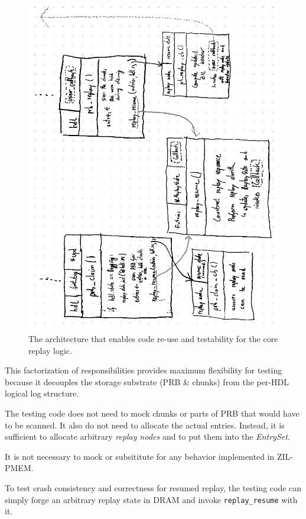 \documentclass[12pt,a4paper,twoside]{book}
\begin{document}
\begin{figure}[H]
    \centering
    \includegraphics{fig/prb_replay_resume_architecture}
    \caption{The architecture that enables code re-use and testability for the core replay logic.}
    \label{fig:eval:prb_replay_resume_architecture}
\end{figure}

This factorization of responsibilities provides maximum flexibility for testing because it decouples the storage substrate (PRB \& chunks) from the per-HDL logical log structure.
\begin{description}[noitemsep]
    \item[Independence of PRB \& Chunks]
        The testing code does not need to mock chunks or parts of PRB that would have to be scanned.
        It also do not need to allocate the actual entries.
        Instead, it is sufficient to allocate arbitrary \textit{replay nodes} and to put them into the \textit{EntrySet}.
    \item[Independence of ZIL-PMEM]
        It is not necessary to mock or subsititute for any behavior implemented in ZIL-PMEM.
    \item[Crash Consistency Testing]
        To test crash consistency and correctness for resumed replay, the testing code can simply forge an arbitrary replay state in DRAM and invoke \lstinline{replay_resume} with it.
\end{description}
\end{document}
